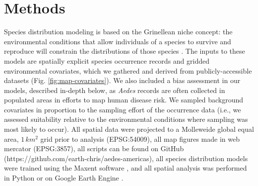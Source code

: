\section{Methods}

Species distribution modeling is based on the Grinellean niche concept: the environmental conditions that allow individuals of a species to survive and reproduce will constrain the distributions of those species \cite{Grinnell1917-aa, Wiens2009-sb}. The inputs to these models are spatially explicit species occurrence records and gridded environmental covariates, which we gathered and derived from publicly-accessible datasets (Fig. \ref{fig:map-covariates}). We also included a bias assessment in our models, described in-depth below, as \textit{Aedes} records are often collected in populated areas in efforts to map human disease risk. We sampled background covariates in proportion to the sampling effort of the occurrence data (i.e., we assessed suitability relative to the environmental conditions where sampling was most likely to occur). All spatial data were projected to a Molleweide global equal area, $1\, km^2$ grid prior to analysis (EPSG:54009), all map figures made in web mercator (EPSG:3857), all scripts can be found on GitHub (https://github.com/earth-chris/aedes-americas), all species distribution models were trained using the Maxent software \cite{Steven_J_Phillips_Miroslav_Dudik_Robert_E_Schapire_undated-nv}, and all spatial analysis was performed in Python or on Google Earth Engine \cite{Gorelick2017-nx}.

